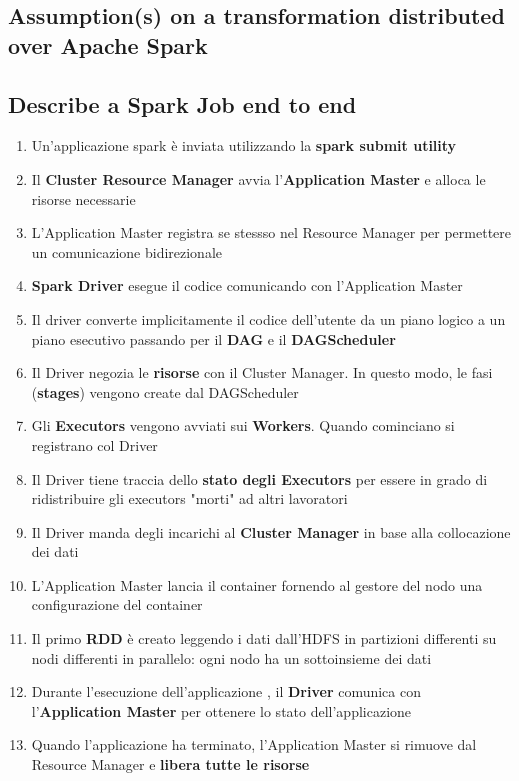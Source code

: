 \documentclass{article}
\begin{document}
\subsection{Assumption(s) on a transformation distributed over Apache Spark}
\subsection{Describe a Spark Job end to end}
\begin{enumerate}
    \item Un'applicazione spark è inviata utilizzando la \textbf{spark submit utility}
    \item Il \textbf{Cluster Resource Manager} avvia l'\textbf{Application Master} e alloca le risorse necessarie
    \item L'Application Master registra se stessso nel Resource Manager per permettere un comunicazione bidirezionale
    \item \textbf{Spark Driver} esegue il codice comunicando con l'Application Master
    \item Il driver converte implicitamente il codice dell'utente da un piano logico a un piano esecutivo passando per il \textbf{DAG} e il \textbf{DAGScheduler}
    \item Il Driver negozia le \textbf{risorse} con il Cluster Manager. In questo modo, le fasi (\textbf{stages}) vengono create dal DAGScheduler
    \item Gli \textbf{Executors} vengono avviati sui \textbf{Workers}. Quando cominciano si registrano col Driver
    \item Il Driver tiene traccia dello \textbf{stato degli Executors} per essere in grado di ridistribuire gli executors "morti" ad altri lavoratori
    \item Il Driver manda degli incarichi al \textbf{Cluster Manager} in base alla collocazione dei dati
    \item L'Application Master lancia il container fornendo al gestore del nodo una configurazione del container
    \item Il primo \textbf{RDD} è creato leggendo i dati dall'HDFS in partizioni differenti su nodi differenti in parallelo: ogni nodo ha un sottoinsieme dei dati
    \item Durante l'esecuzione dell'applicazione , il \textbf{Driver} comunica con l'\textbf{Application Master} per ottenere lo stato dell'applicazione
    \item Quando l'applicazione ha terminato, l'Application Master si rimuove dal Resource Manager e \textbf{libera tutte le risorse}
\end{enumerate}
\end{document}
